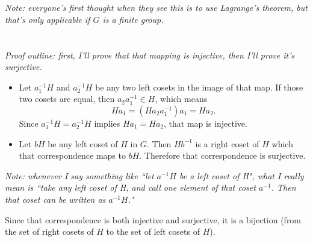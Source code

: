 \documentclass[12pt]{article}
\begin{document}
\section{}
\noindent{}\bigskip

\textit{Note: everyone's first thought when they see this is to use Lagrange's theorem, but that's only applicable if $G$ is a finite group.}

\section{}
\noindent{}\bigskip

\textit{Proof outline: first, I'll prove that that mapping is injective, then I'll prove it's surjective.}

\begin{itemize}
    \item Let $a_1^{-1}H$ and $a_2^{-1}H$ be any two left cosets in the image of that map. If those two cosets are equal, then $a_2 a_1^{-1} \in H$, which means
        \[ Ha_1 = (Ha_2a_1^{-1})a_1 = Ha_2. \]
        Since $a_1^{-1}H=a_2^{-1}H$ implies $Ha_1=Ha_2$, that map is injective.
    \item Let $bH$ be any left coset of $H$ in $G$. Then $Hb^{-1}$ is a right coset of $H$ which that correspondence maps to $bH$. Therefore that correspondence is surjective.
\end{itemize}

\textit{Note: whenever I say something like ``let $a^{-1}H$ be a left coset of H", what I really mean is ``take any left coset of H, and call one element of that coset $a^{-1}$. Then that coset can be written as $a^{-1}H$."}
\par
Since that correspondence is both injective and surjective, it is a bijection (from the set of right cosets of $H$ to the set of left cosets of $H$).
\end{document}
